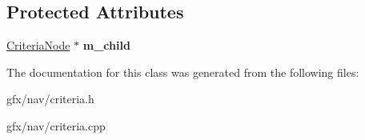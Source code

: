 \subsection*{Protected Attributes}
\begin{DoxyCompactItemize}
\item 
\hyperlink{classCriteriaNode}{Criteria\+Node} $\ast$ {\bfseries m\+\_\+child}\hypertarget{classCriteriaNot_a407397c9534d8d5d652ad4abeda8fba5}{}\label{classCriteriaNot_a407397c9534d8d5d652ad4abeda8fba5}

\end{DoxyCompactItemize}


The documentation for this class was generated from the following files\+:\begin{DoxyCompactItemize}
\item 
gfx/nav/criteria.\+h\item 
gfx/nav/criteria.\+cpp\end{DoxyCompactItemize}

